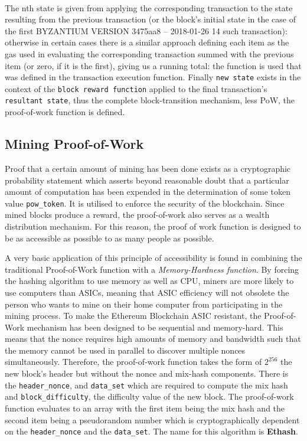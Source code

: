 \documentclass[10pt,letterpaper,leqno,bibliography=totoc]{scrartcl}
\newenvironment{alphafootnotes}
{\par\edef\savedfootnotenumber{\number\value{footnote}}
\renewcommand{\thefootnote}{\alph{footnote}}
\setcounter{footnote}{0}}
{\par\setcounter{footnote}{\savedfootnotenumber}}
\begin{document}
\begin{alphafootnotes}
\begin{multicols*}{2}
		\paragraph{}The nth state is given from applying the corresponding transaction to the state resulting from the previous transaction (or the block’s initial state in the case of the first BYZANTIUM VERSION 3475aa8 -- 2018-01-26 14 such transaction): otherwise in certain cases there is a similar approach defining each item as the gas used in evaluating the corresponding transaction summed with the previous item (or zero, if it is the first), giving us a running total: the function is used that was defined in the transaction execution function. Finally \texttt{new state} exists in the context of the \texttt{block reward function} applied to the final transaction’s \texttt{resultant state}, thus the complete block-transition mechanism, less PoW, the proof-of-work function is defined. 
		
		
		\subsection{Mining Proof-of-Work} Proof that a certain amount of mining has been done exists as a cryptographic probability statement which asserts beyond reasonable doubt that a particular amount of computation has been expended in the determination of some token value \texttt{pow\_token}. It is utilised to enforce the security of the blockchain. Since mined blocks produce a reward, the proof-of-work also serves  as a wealth distribution mechanism. For this reason, the  proof of work function is designed to be as accessible as possible to as many people as possible. 

		A very basic application of this principle of accessibility is found in combining the traditional Proof-of-Work function with a \textit{Memory-Hardness function}. By forcing the hashing algorithm to use memory as well as CPU, miners are more likely to use computers than ASICs, meaning that ASIC efficiency will not obsolete the person who wants to mine on their home computer from participating in the mining process.  To make the Ethereum Blockchain ASIC resistant, the Proof-of-Work mechanism has been designed to be sequential and  memory-hard. This means that the nonce requires high amounts of memory and bandwidth such that the memory cannot be used in parallel to discover multiple nonces simultaneously. Therefore, the proof-of-work function takes the form of $2^{256}$ the new block’s header but without the nonce and mix-hash components. There is the \texttt{header\_nonce}, and \texttt{data\_set} which are required  to compute the mix hash and \texttt{block\_difficulty}, the difficulty value of the new block. The proof-of-work function evaluates to an array with the first item being the mix hash and the second item being a pseudorandom number which is cryptographically dependent on the \texttt{header\_nonce} and the \texttt{data\_set}. The name for this algorithm is \textbf{Ethash}. 
			

\end{multicols*}
\end{alphafootnotes}
\end{document}
